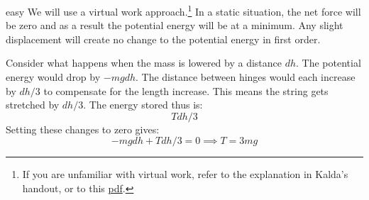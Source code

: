 \begin{solution}{easy}
We will use a virtual work approach.\footnote{If you are unfamiliar with virtual work, refer to the explanation in Kalda's handout, or to this \href{http://docshare04.docshare.tips/files/26737/267376365.pdf}{pdf}.} In a static situation, the net force will be zero and as a result the potential energy will be at a minimum. Any slight displacement will create no change to the potential energy in first order.
\vspace{2mm}

Consider what happens when the mass is lowered by a distance $dh$. The potential energy would drop by $-mg dh$. The distance between hinges would each increase by $dh/3$ to compensate for the length increase. This means the string gets stretched by $dh/3$. The energy stored thus is:$$T dh/3$$Setting these changes to zero gives:
$$-mg dh + T dh/3 = 0 \implies \boxed{T = 3mg}$$
\end{solution}
